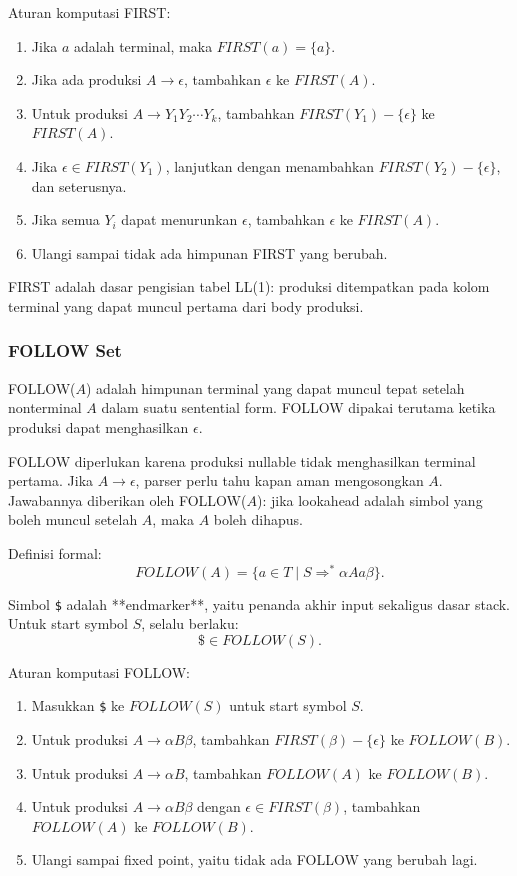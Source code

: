 Aturan komputasi FIRST:
\begin{enumerate}
    \item Jika $a$ adalah terminal, maka $FIRST(a)=\{a\}$.
    \item Jika ada produksi $A\rightarrow\epsilon$, tambahkan $\epsilon$ ke $FIRST(A)$.
    \item Untuk produksi $A\rightarrow Y_1Y_2\cdots Y_k$, tambahkan $FIRST(Y_1)-\{\epsilon\}$ ke $FIRST(A)$.
    \item Jika $\epsilon\in FIRST(Y_1)$, lanjutkan dengan menambahkan $FIRST(Y_2)-\{\epsilon\}$, dan seterusnya.
    \item Jika semua $Y_i$ dapat menurunkan $\epsilon$, tambahkan $\epsilon$ ke $FIRST(A)$.
    \item Ulangi sampai tidak ada himpunan FIRST yang berubah.
\end{enumerate}

FIRST adalah dasar pengisian tabel LL(1): produksi ditempatkan pada kolom terminal yang dapat muncul pertama dari body produksi.

\subsubsection{FOLLOW Set}

\begin{jawab}
FOLLOW($A$) adalah himpunan terminal yang dapat muncul tepat setelah nonterminal $A$ dalam suatu sentential form. FOLLOW dipakai terutama ketika produksi dapat menghasilkan $\epsilon$.
\end{jawab}

FOLLOW diperlukan karena produksi nullable tidak menghasilkan terminal pertama. Jika $A\rightarrow\epsilon$, parser perlu tahu kapan aman mengosongkan $A$. Jawabannya diberikan oleh FOLLOW($A$): jika lookahead adalah simbol yang boleh muncul setelah $A$, maka $A$ boleh dihapus.

Definisi formal:
\[
    FOLLOW(A)=\{a\in T \mid S\Rightarrow^* \alpha Aa\beta\}.
\]

Simbol \texttt{\$} adalah **endmarker**, yaitu penanda akhir input sekaligus dasar stack. Untuk start symbol $S$, selalu berlaku:
\[
    \$\in FOLLOW(S).
\]

Aturan komputasi FOLLOW:
\begin{enumerate}
    \item Masukkan \texttt{\$} ke $FOLLOW(S)$ untuk start symbol $S$.
    \item Untuk produksi $A\rightarrow \alpha B\beta$, tambahkan $FIRST(\beta)-\{\epsilon\}$ ke $FOLLOW(B)$.
    \item Untuk produksi $A\rightarrow \alpha B$, tambahkan $FOLLOW(A)$ ke $FOLLOW(B)$.
    \item Untuk produksi $A\rightarrow \alpha B\beta$ dengan $\epsilon\in FIRST(\beta)$, tambahkan $FOLLOW(A)$ ke $FOLLOW(B)$.
    \item Ulangi sampai fixed point, yaitu tidak ada FOLLOW yang berubah lagi.
\end{enumerate}

